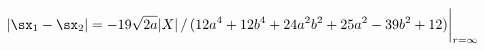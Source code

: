 \begin{equation}
 |\sx_1-\sx_2| = -19 \sqrt{2 a} |X| \, / \,
 (12a^4+12b^4+24a^2b^2+25a^2-39b^2+12) \biggr|_{r=\infty}
\end{equation}

